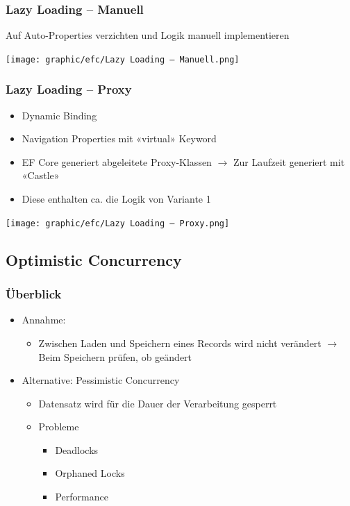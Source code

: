 \subsubsection{Lazy Loading – Manuell}
Auf Auto-Properties verzichten und Logik manuell implementieren
\vspace{-8pt}
\begin{center}
    \texttt{[image: graphic/efc/Lazy Loading – Manuell.png]}
\end{center}
\vspace{-8pt}

\subsubsection{Lazy Loading – Proxy}
\begin{itemize}
    \item Dynamic Binding
    \item Navigation Properties mit «virtual» Keyword
    \item EF Core generiert abgeleitete Proxy-Klassen $\rightarrow$ Zur Laufzeit generiert mit «Castle»
    \item Diese enthalten ca. die Logik von Variante 1
\end{itemize}
\vspace{-8pt}
\begin{center}
    \texttt{[image: graphic/efc/Lazy Loading – Proxy.png]}
\end{center}
\vspace{-8pt}

\subsection{Optimistic Concurrency}
\subsubsection{Überblick}
\begin{itemize}
    \item Annahme:
    \begin{itemize}
        \item Zwischen Laden und Speichern eines Records wird nicht verändert $\rightarrow$ Beim Speichern prüfen, ob geändert
    \end{itemize}
    \item Alternative: Pessimistic Concurrency
    \begin{itemize}
        \item Datensatz wird für die Dauer der Verarbeitung gesperrt
        \item Probleme
        \begin{itemize}
            \item Deadlocks
            \item Orphaned Locks
            \item Performance
        \end{itemize}
    \end{itemize}
\end{itemize}

